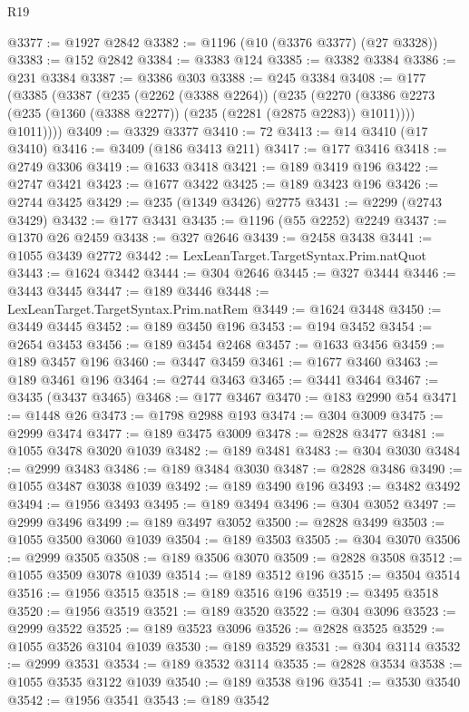 \begin{lexlean}{R19}
\begin{coremodule}
@3377 := @1927 @2842
@3382 := @1196 (@10 (@3376 @3377) (@27 @3328))
@3383 := @152 @2842
@3384 := @3383 @124
@3385 := @3382 @3384
@3386 := @231 @3384
@3387 := @3386 @303
@3388 := @245 @3384
@3408 := @177
    (@3385
      (@3387
        (@235
          (@2262 (@3388 @2264))
          (@235
            (@2270 (@3386 @2273 (@235 (@1360 (@3388 @2277)) (@235 (@2281 (@2875 @2283)) @1011))))
            @1011))))
@3409 := @3329 @3377
@3410 := 72
@3413 := @14 @3410 (@17 @3410)
@3416 := @3409 (@186 @3413 @211)
@3417 := @177 @3416
@3418 := @2749 @3306
@3419 := @1633 @3418
@3421 := @189 @3419 @196
@3422 := @2747 @3421
@3423 := @1677 @3422
@3425 := @189 @3423 @196
@3426 := @2744 @3425
@3429 := @235 (@1349 @3426) @2775
@3431 := @2299 (@2743 @3429)
@3432 := @177 @3431
@3435 := @1196 (@55 @2252) @2249
@3437 := @1370 @26 @2459
@3438 := @327 @2646
@3439 := @2458 @3438
@3441 := @1055 @3439 @2772
@3442 := LexLeanTarget.TargetSyntax.Prim.natQuot
@3443 := @1624 @3442
@3444 := @304 @2646
@3445 := @327 @3444
@3446 := @3443 @3445
@3447 := @189 @3446
@3448 := LexLeanTarget.TargetSyntax.Prim.natRem
@3449 := @1624 @3448
@3450 := @3449 @3445
@3452 := @189 @3450 @196
@3453 := @194 @3452
@3454 := @2654 @3453
@3456 := @189 @3454 @2468
@3457 := @1633 @3456
@3459 := @189 @3457 @196
@3460 := @3447 @3459
@3461 := @1677 @3460
@3463 := @189 @3461 @196
@3464 := @2744 @3463
@3465 := @3441 @3464
@3467 := @3435 (@3437 @3465)
@3468 := @177 @3467
@3470 := @183 @2990 @54
@3471 := @1448 @26
@3473 := @1798 @2988 @193
@3474 := @304 @3009
@3475 := @2999 @3474
@3477 := @189 @3475 @3009
@3478 := @2828 @3477
@3481 := @1055 @3478 @3020 @1039
@3482 := @189 @3481
@3483 := @304 @3030
@3484 := @2999 @3483
@3486 := @189 @3484 @3030
@3487 := @2828 @3486
@3490 := @1055 @3487 @3038 @1039
@3492 := @189 @3490 @196
@3493 := @3482 @3492
@3494 := @1956 @3493
@3495 := @189 @3494
@3496 := @304 @3052
@3497 := @2999 @3496
@3499 := @189 @3497 @3052
@3500 := @2828 @3499
@3503 := @1055 @3500 @3060 @1039
@3504 := @189 @3503
@3505 := @304 @3070
@3506 := @2999 @3505
@3508 := @189 @3506 @3070
@3509 := @2828 @3508
@3512 := @1055 @3509 @3078 @1039
@3514 := @189 @3512 @196
@3515 := @3504 @3514
@3516 := @1956 @3515
@3518 := @189 @3516 @196
@3519 := @3495 @3518
@3520 := @1956 @3519
@3521 := @189 @3520
@3522 := @304 @3096
@3523 := @2999 @3522
@3525 := @189 @3523 @3096
@3526 := @2828 @3525
@3529 := @1055 @3526 @3104 @1039
@3530 := @189 @3529
@3531 := @304 @3114
@3532 := @2999 @3531
@3534 := @189 @3532 @3114
@3535 := @2828 @3534
@3538 := @1055 @3535 @3122 @1039
@3540 := @189 @3538 @196
@3541 := @3530 @3540
@3542 := @1956 @3541
@3543 := @189 @3542

\end{coremodule}
\end{lexlean}
